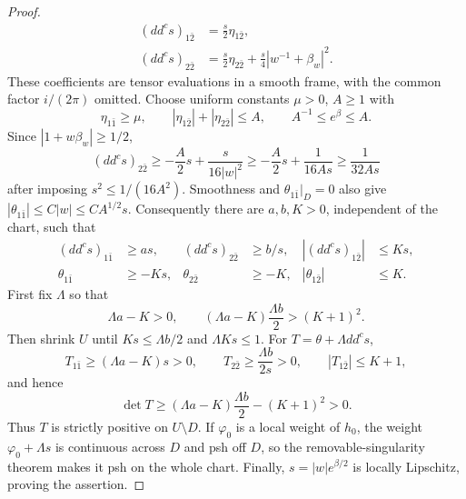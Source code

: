 \documentclass[11pt]{amsart}
\theoremstyle{definition}
\theoremstyle{remark}
\numberwithin{equation}{section}
\newcommand{\ddc}{dd^c}
\begin{document}
\begin{proof}
\[\begin{aligned}
 (\ddc s)_{1\bar2}&=\tfrac{s}{2}\eta_{1\bar2},\\
 (\ddc s)_{2\bar2}&=\tfrac{s}{2}\eta_{2\bar2}
           +\tfrac{s}{4}|w^{-1}+\beta_w|^2.
 \end{aligned}
\]
These coefficients are tensor evaluations in a smooth frame,
with the common factor $i/(2\pi)$ omitted.
Choose uniform constants $\mu>0$, $A\ge1$ with
\[
 \eta_{1\bar1}\ge\mu,\qquad
 |\eta_{1\bar2}|+|\eta_{2\bar2}|\le A,\qquad
 A^{-1}\le e^\beta\le A.
\]
Since $|1+w\beta_w|\ge1/2$,
\[
 (\ddc s)_{2\bar2}\ge-\frac A2s+
        \frac{s}{16|w|^2}
 \ge-\frac A2s+\frac1{16As}\ge\frac1{32As}
\]
after imposing $s^2\le1/(16A^2)$. Smoothness and
$\theta_{1\bar1}|_D=0$ also give
$|\theta_{1\bar1}|\le C|w|\le C A^{1/2}s$.
Consequently there are $a,b,K>0$, independent of the chart, such
that
\begin{equation}\label{eq:cusp-estimates}
 \begin{aligned}
 (\ddc s)_{1\bar1}&\ge as,&
 (\ddc s)_{2\bar2}&\ge b/s,&
 |(\ddc s)_{1\bar2}|&\le Ks,\\
 \theta_{1\bar1}&\ge-Ks,&
 \theta_{2\bar2}&\ge-K,&
 |\theta_{1\bar2}|&\le K.
 \end{aligned}
\end{equation}
First fix $\Lambda$ so that
\begin{equation}\label{eq:cusp-coefficient}
 \Lambda a-K>0,\qquad
 (\Lambda a-K)\frac{\Lambda b}{2}>(K+1)^2.
\end{equation}
Then shrink $U$ until $Ks\le\Lambda b/2$ and
$\Lambda Ks\le1$. For $T=\theta+\Lambda\ddc s$,
\[
 T_{1\bar1}\ge(\Lambda a-K)s>0,\qquad
 T_{2\bar2}\ge\frac{\Lambda b}{2s}>0,\qquad
 |T_{1\bar2}|\le K+1,
\]
and hence
\[
 \det T\ge(\Lambda a-K)\frac{\Lambda b}{2}-(K+1)^2>0.
\]
Thus $T$ is strictly positive on $U\setminus D$. If $\varphi_0$ is a
local weight of $h_0$, the weight
$\varphi_0+\Lambda s$ is continuous across $D$ and psh off $D$, so
the removable-singularity theorem makes it psh on the whole chart. Finally,
$s=|w|e^{\beta/2}$ is locally Lipschitz, proving the assertion.
\end{proof}
\end{document}
